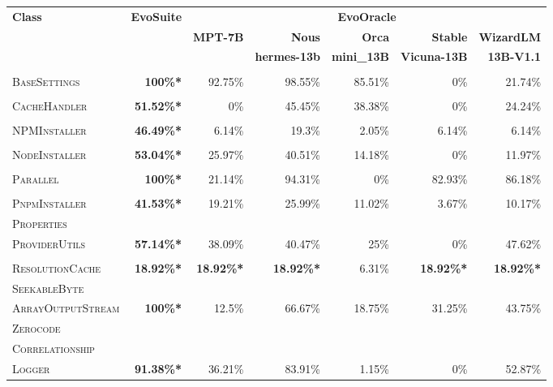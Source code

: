 \begin{table}[H]
\centering

\begin{tabular}{| l | r | r | r | r | r | r |}
\hline
\multirow{2}{*}{\textbf{Class}} & \multirow{2}{*}{\textbf{EvoSuite}} & \multicolumn{5}{c|}{\textbf{EvoOracle}} \\ %
\cline{3-7} %
 &  & \textbf{MPT-7B} & \textbf{Nous} & \textbf{Orca} & \textbf{Stable} & \textbf{WizardLM} \\
 &  &  & \textbf{hermes-13b} & \textbf{mini\_13B} & \textbf{Vicuna-13B} & \textbf{13B-V1.1} \\
\hline
\scriptsize\textsc{} &  &  &  &  &  &  \\
\scriptsize\textsc{BaseSettings} & \textbf{100\%*} & 92.75\% & 98.55\% & 85.51\% & 0\% & 21.74\% \\
\hline
\scriptsize\textsc{} &  &  &  &  &  &  \\
\scriptsize\textsc{CacheHandler} & \textbf{51.52\%*} & 0\% & 45.45\% & 38.38\% & 0\% & 24.24\% \\
\hline
\scriptsize\textsc{} &  &  &  &  &  &  \\
\scriptsize\textsc{NPMInstaller} & \textbf{46.49\%*} & 6.14\% & 19.3\% & 2.05\% & 6.14\% & 6.14\% \\
\hline
\scriptsize\textsc{} &  &  &  &  &  &  \\
\scriptsize\textsc{NodeInstaller} & \textbf{53.04\%*} & 25.97\% & 40.51\% & 14.18\% & 0\% & 11.97\% \\
\hline
\scriptsize\textsc{} &  &  &  &  &  &  \\
\scriptsize\textsc{Parallel} & \textbf{100\%*} & 21.14\% & 94.31\% & 0\% & 82.93\% & 86.18\% \\
\hline
\scriptsize\textsc{} &  &  &  &  &  &  \\
\scriptsize\textsc{PnpmInstaller} & \textbf{41.53\%*} & 19.21\% & 25.99\% & 11.02\% & 3.67\% & 10.17\% \\
\hline
\scriptsize\textsc{Properties} &  &  &  &  &  &  \\
\scriptsize\textsc{ProviderUtils} & \textbf{57.14\%*} & 38.09\% & 40.47\% & 25\% & 0\% & 47.62\% \\
\hline
\scriptsize\textsc{} &  &  &  &  &  &  \\
\scriptsize\textsc{ResolutionCache} & \textbf{18.92\%*} & \textbf{18.92\%*} & \textbf{18.92\%*} & 6.31\% & \textbf{18.92\%*} & \textbf{18.92\%*} \\
\hline
\scriptsize\textsc{SeekableByte} &  &  &  &  &  &  \\
\scriptsize\textsc{ArrayOutputStream} & \textbf{100\%*} & 12.5\% & 66.67\% & 18.75\% & 31.25\% & 43.75\% \\
\hline
\scriptsize\textsc{Zerocode} &  &  &  &  &  &  \\
\scriptsize\textsc{Correlationship} &  &  &  &  &  &  \\
\scriptsize\textsc{Logger} & \textbf{91.38\%*} & 36.21\% & 83.91\% & 1.15\% & 0\% & 52.87\% \\
\hline


\end{tabular}
\end{table}
